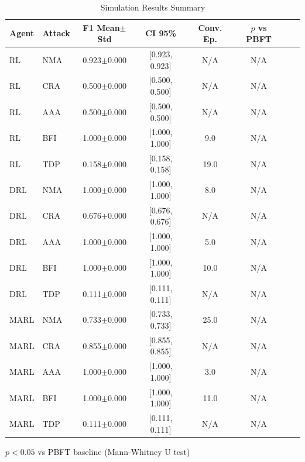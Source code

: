 \begin{table}[htbp]
\centering
\caption{Simulation Results Summary}
\label{tab:results}
\begin{tabular}{llcccccc}
\toprule
Agent & Attack & F1 Mean$\pm$Std & CI 95\% & Conv. Ep. & $p$ vs PBFT \\
\midrule
RL & NMA & 0.923$\pm$0.000 & [0.923, 0.923] & N/A & N/A \\
RL & CRA & 0.500$\pm$0.000 & [0.500, 0.500] & N/A & N/A \\
RL & AAA & 0.500$\pm$0.000 & [0.500, 0.500] & N/A & N/A \\
RL & BFI & 1.000$\pm$0.000 & [1.000, 1.000] & 9.0 & N/A \\
RL & TDP & 0.158$\pm$0.000 & [0.158, 0.158] & 19.0 & N/A \\
DRL & NMA & 1.000$\pm$0.000 & [1.000, 1.000] & 8.0 & N/A \\
DRL & CRA & 0.676$\pm$0.000 & [0.676, 0.676] & N/A & N/A \\
DRL & AAA & 1.000$\pm$0.000 & [1.000, 1.000] & 5.0 & N/A \\
DRL & BFI & 1.000$\pm$0.000 & [1.000, 1.000] & 10.0 & N/A \\
DRL & TDP & 0.111$\pm$0.000 & [0.111, 0.111] & N/A & N/A \\
MARL & NMA & 0.733$\pm$0.000 & [0.733, 0.733] & 25.0 & N/A \\
MARL & CRA & 0.855$\pm$0.000 & [0.855, 0.855] & N/A & N/A \\
MARL & AAA & 1.000$\pm$0.000 & [1.000, 1.000] & 3.0 & N/A \\
MARL & BFI & 1.000$\pm$0.000 & [1.000, 1.000] & 11.0 & N/A \\
MARL & TDP & 0.111$\pm$0.000 & [0.111, 0.111] & N/A & N/A \\
\bottomrule
\end{tabular}
\begin{tablenotes}\footnotesize
\item[$\dagger$] $p < 0.05$ vs PBFT baseline (Mann-Whitney U test)
\end{tablenotes}
\end{table}